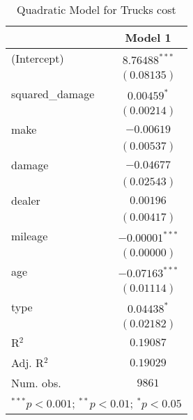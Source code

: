 
\begin{table}
\begin{center}
\begin{tabular}{l c}
\hline
 & Model 1 \\
\hline
(Intercept)     & $8.76488^{***}$  \\
                & $(0.08135)$      \\
squared\_damage & $0.00459^{*}$    \\
                & $(0.00214)$      \\
make            & $-0.00619$       \\
                & $(0.00537)$      \\
damage          & $-0.04677$       \\
                & $(0.02543)$      \\
dealer          & $0.00196$        \\
                & $(0.00417)$      \\
mileage         & $-0.00001^{***}$ \\
                & $(0.00000)$      \\
age             & $-0.07163^{***}$ \\
                & $(0.01114)$      \\
type            & $0.04438^{*}$    \\
                & $(0.02182)$      \\
\hline
R$^2$           & $0.19087$        \\
Adj. R$^2$      & $0.19029$        \\
Num. obs.       & $9861$           \\
\hline
\multicolumn{2}{l}{\scriptsize{$^{***}p<0.001$; $^{**}p<0.01$; $^{*}p<0.05$}}
\end{tabular}
\caption{Quadratic Model for Trucks cost}
\label{tab:reg_sq_damage}
\end{center}
\end{table}
